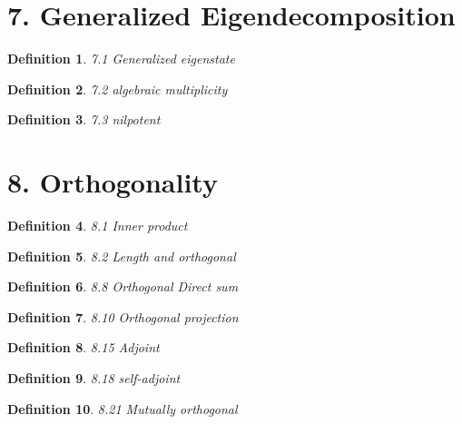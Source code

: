 \documentclass[12pt]{article}
\theoremstyle{plain}
\newtheorem{definition}{Definition}
\begin{document}
\section{7. Generalized Eigendecomposition}

\begin{definition} 
  7.1 Generalized eigenstate
\end{definition}



\begin{definition} 
 7.2 algebraic multiplicity 
\end{definition}



\begin{definition} 
 7.3 nilpotent 
\end{definition}


\section{8. Orthogonality}



\begin{definition} 
 8.1 Inner product  
\end{definition}



\begin{definition} 
 8.2 Length and orthogonal 
\end{definition}



\begin{definition} 
 8.8 Orthogonal Direct sum
\end{definition}



\begin{definition} 
 8.10 Orthogonal projection
\end{definition}


\begin{definition} 
 8.15 Adjoint 
\end{definition}



\begin{definition} 
 8.18 self-adjoint 
\end{definition}



\begin{definition} 
 8.21 Mutually orthogonal 
\end{definition}
\end{document}

